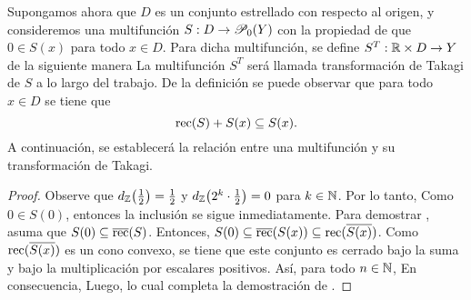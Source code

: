 Supongamos ahora que $D$ es un conjunto estrellado con respecto al origen, 
y consideremos una multifunción $S:D\to\P_0(Y)$ con la propiedad de 
que $0\in S(x)$ para todo $x\in D$.
Para dicha multifunción, se define $S^T:\R\times D\to Y$ de la siguiente manera
La multifunción $S^T$ será llamada transformación de Takagi de $S$ a lo largo del trabajo. 
De la definición se puede observar que para todo $x\in D$ se tiene que 
$$\rec(S)+S(x)\subseteq S(x).$$ 
A continuación, se establecerá la relación entre
una multifunción y su transformación de Takagi.
\begin{proof} 
Observe que $d_{\Z}\big(\tfrac12\big)=\tfrac12$ y $d_{\Z}\big(2^k\cdot\tfrac12\big)=0$ para $k\in\N$.
Por lo tanto,
Como $0\in S(0)$, entonces la inclusión  se sigue inmediatamente. Para demostrar
, asuma que $S(0)\subseteq \overline\rec(S)$. Entonces, 
$S(0)\subseteq \overline\rec(S(x))\subseteq\rec(\overline{S(x)})$.
Como $\rec(\overline{S(x)})$ es un cono convexo, se tiene que este conjunto es cerrado
bajo la suma y bajo la multiplicación por escalares positivos.
Así, para todo $n\in\N$,
En consecuencia, 
Luego,
lo cual completa la demostración de . 
\end{proof}

